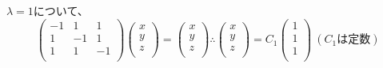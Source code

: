 \documentclass[]{jsarticle}
\begin{document}
        $\lambda = 1$について、
        \begin{equation*}
            \begin{pmatrix}
                -1 & 1 & 1 \\
                1 & -1 & 1 \\
                1 & 1 & -1 \\
            \end{pmatrix}
            \begin{pmatrix}
                x \\
                y \\
                z \\
            \end{pmatrix} =
            \begin{pmatrix}
                x \\
                y \\
                z \\
            \end{pmatrix}
            \therefore
            \begin{pmatrix}
                x \\
                y \\
                z \\
            \end{pmatrix} =
            C_1\begin{pmatrix}
                1 \\
                1 \\
                1 \\
            \end{pmatrix} \
            (C_1は定数)
        \end{equation*}
\end{document}
